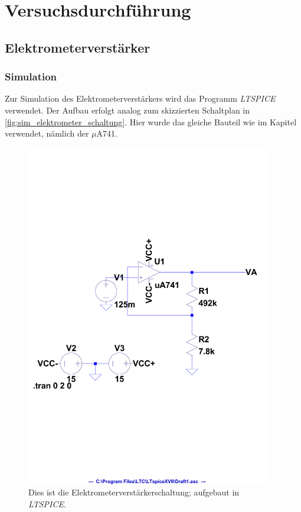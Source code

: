 \documentclass[12pt,english,ngerman]{scrartcl}
\begin{document}
\section{Versuchsdurchführung}\label{sec:versuchsdurchfuehrung}

\subsection{Elektrometerverstärker}

\subsubsection{Simulation} \label{sec:Versuchsim}

Zur Simulation des Elektrometerverstärkers wird das Programm
\textit{LTSPICE} verwendet. Der Aufbau erfolgt analog zum skizzierten
Schaltplan in \autoref{fig:sim_elektrometer_schaltung}. Hier wurde das gleiche
Bauteil wie im Kapitel  verwendet, nämlich der $\mu$A741.

\begin{figure}[H]
  \centering
    \includegraphics[width=0.95\textwidth]{./figures/elektrometer/sim/sim_schaltung.pdf}
  \caption{Dies ist die Elektrometerverstärkerschaltung; aufgebaut in \textit{LTSPICE}.}
  \label{fig:sim_elektrometer_schaltung}
\end{figure}
\end{document}
